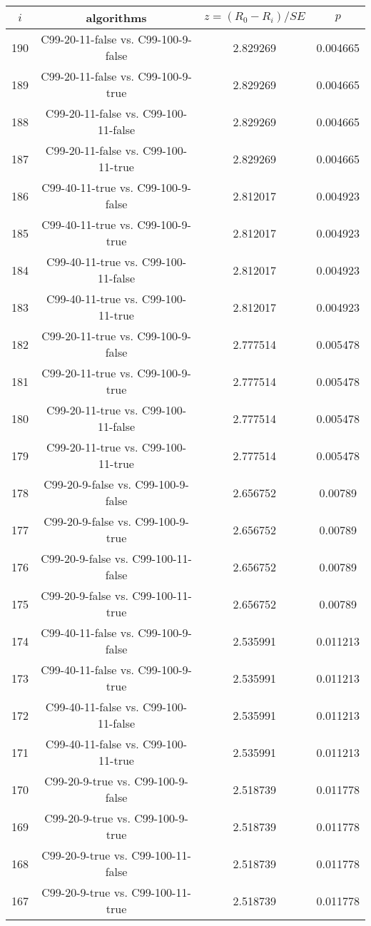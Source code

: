 \documentclass[a4paper,10pt]{article}
\begin{document}
\begin{landscape}
\begin{table}[!htp]
\centering\scriptsize
\begin{tabular}{cccc}
$i$&algorithms&$z=(R_0 - R_i)/SE$&$p$\\
\hline190&C99-20-11-false vs. C99-100-9-false&2.829269&0.004665\\
189&C99-20-11-false vs. C99-100-9-true&2.829269&0.004665\\
188&C99-20-11-false vs. C99-100-11-false&2.829269&0.004665\\
187&C99-20-11-false vs. C99-100-11-true&2.829269&0.004665\\
186&C99-40-11-true vs. C99-100-9-false&2.812017&0.004923\\
185&C99-40-11-true vs. C99-100-9-true&2.812017&0.004923\\
184&C99-40-11-true vs. C99-100-11-false&2.812017&0.004923\\
183&C99-40-11-true vs. C99-100-11-true&2.812017&0.004923\\
182&C99-20-11-true vs. C99-100-9-false&2.777514&0.005478\\
181&C99-20-11-true vs. C99-100-9-true&2.777514&0.005478\\
180&C99-20-11-true vs. C99-100-11-false&2.777514&0.005478\\
179&C99-20-11-true vs. C99-100-11-true&2.777514&0.005478\\
178&C99-20-9-false vs. C99-100-9-false&2.656752&0.00789\\
177&C99-20-9-false vs. C99-100-9-true&2.656752&0.00789\\
176&C99-20-9-false vs. C99-100-11-false&2.656752&0.00789\\
175&C99-20-9-false vs. C99-100-11-true&2.656752&0.00789\\
174&C99-40-11-false vs. C99-100-9-false&2.535991&0.011213\\
173&C99-40-11-false vs. C99-100-9-true&2.535991&0.011213\\
172&C99-40-11-false vs. C99-100-11-false&2.535991&0.011213\\
171&C99-40-11-false vs. C99-100-11-true&2.535991&0.011213\\
170&C99-20-9-true vs. C99-100-9-false&2.518739&0.011778\\
169&C99-20-9-true vs. C99-100-9-true&2.518739&0.011778\\
168&C99-20-9-true vs. C99-100-11-false&2.518739&0.011778\\
167&C99-20-9-true vs. C99-100-11-true&2.518739&0.011778\\

\end{tabular}
\end{table}
\end{landscape}
\end{document}

